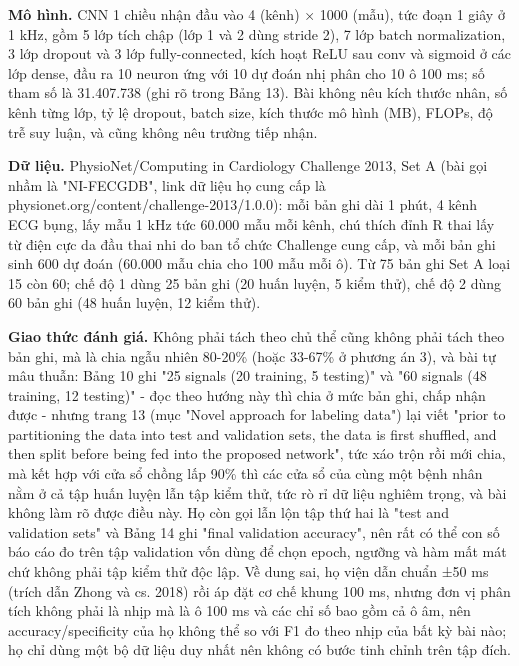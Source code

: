 \documentclass[12pt,a4paper]{article}
\begin{document}
\noindent \textbf{Mô hình.} CNN 1 chiều nhận đầu vào 4 (kênh) × 1000 (mẫu), tức đoạn 1 giây ở 1 kHz, gồm 5 lớp tích chập (lớp 1 và 2 dùng stride 2), 7 lớp batch normalization, 3 lớp dropout và 3 lớp fully-connected, kích hoạt ReLU sau conv và sigmoid ở các lớp dense, đầu ra 10 neuron ứng với 10 dự đoán nhị phân cho 10 ô 100 ms; số tham số là 31.407.738 (ghi rõ trong Bảng 13). Bài không nêu kích thước nhân, số kênh từng lớp, tỷ lệ dropout, batch size, kích thước mô hình (MB), FLOPs, độ trễ suy luận, và cũng không nêu trường tiếp nhận.\par\vspace{3pt}
\noindent \textbf{Dữ liệu.} PhysioNet/Computing in Cardiology Challenge 2013, Set A (bài gọi nhầm là "NI-FECGDB", link dữ liệu họ cung cấp là physionet.org/content/challenge-2013/1.0.0): mỗi bản ghi dài 1 phút, 4 kênh ECG bụng, lấy mẫu 1 kHz tức 60.000 mẫu mỗi kênh, chú thích đỉnh R thai lấy từ điện cực da đầu thai nhi do ban tổ chức Challenge cung cấp, và mỗi bản ghi sinh 600 dự đoán (60.000 mẫu chia cho 100 mẫu mỗi ô). Từ 75 bản ghi Set A loại 15 còn 60; chế độ 1 dùng 25 bản ghi (20 huấn luyện, 5 kiểm thử), chế độ 2 dùng 60 bản ghi (48 huấn luyện, 12 kiểm thử).\par\vspace{3pt}
\noindent \textbf{Giao thức đánh giá.} Không phải tách theo chủ thể cũng không phải tách theo bản ghi, mà là chia ngẫu nhiên 80-20\% (hoặc 33-67\% ở phương án 3), và bài tự mâu thuẫn: Bảng 10 ghi "25 signals (20 training, 5 testing)" và "60 signals (48 training, 12 testing)" - đọc theo hướng này thì chia ở mức bản ghi, chấp nhận được - nhưng trang 13 (mục "Novel approach for labeling data") lại viết "prior to partitioning the data into test and validation sets, the data is first shuffled, and then split before being fed into the proposed network", tức xáo trộn rồi mới chia, mà kết hợp với cửa sổ chồng lấp 90\% thì các cửa sổ của cùng một bệnh nhân nằm ở cả tập huấn luyện lẫn tập kiểm thử, tức rò rỉ dữ liệu nghiêm trọng, và bài không làm rõ được điều này. Họ còn gọi lẫn lộn tập thứ hai là "test and validation sets" và Bảng 14 ghi "final validation accuracy", nên rất có thể con số báo cáo đo trên tập validation vốn dùng để chọn epoch, ngưỡng và hàm mất mát chứ không phải tập kiểm thử độc lập. Về dung sai, họ viện dẫn chuẩn ±50 ms (trích dẫn Zhong và cs. 2018) rồi áp đặt cơ chế khung 100 ms, nhưng đơn vị phân tích không phải là nhịp mà là ô 100 ms và các chỉ số bao gồm cả ô âm, nên accuracy/specificity của họ không thể so với F1 đo theo nhịp của bất kỳ bài nào; họ chỉ dùng một bộ dữ liệu duy nhất nên không có bước tinh chỉnh trên tập đích.\par\vspace{3pt}
\end{document}
